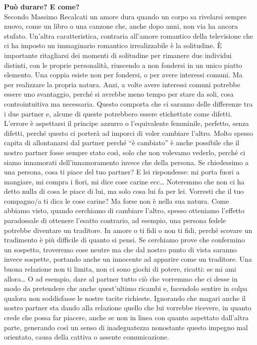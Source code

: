 \documentclass[12pt]{book} %
\begin{document}
\noindent \textbf{\large Può durare? E come?} \\
Secondo Massimo Recalcati un amore dura quando un corpo sa rivelarsi sempre nuovo, come un libro o una canzone che,
anche dopo anni, non via ha ancora stufato. Un'altra caratteristica, contraria
all'amore romantico della televisione che ci ha imposto un immaginario romantico irrealizzabile è
la solitudine. È importante ritagliarsi dei momenti di solitudine per rimanere due individui distinti, con le proprie
personalità, riuscendo a non fondersi in un unico piatto elemento. Una coppia esiste non per fondersi, o per avere
interessi comuni. Ma per realizzare la propria natura. Anzi, a volte avere interessi comuni potrebbe essere uno
svantaggio, perché si avrebbe meno tempo per stare da soli, cosa controintuitiva ma necessaria. Questo comporta che ci
saranno delle differenze tra i due partner e, alcune di queste potrebbero essere etichettate come difetti.
L'errore è aspettarsi il principe azzurro o l'equivalente femminile,
perfetto, senza difetti, perché questo ci porterà ad imporci di voler cambiare l'altro. Molto
spesso capita di allontanarsi dal partner perché “è cambiato” è anche possibile che il nostro partner fosse sempre stato così, solo che non
volevamo vederlo, perché ci siamo innamorati dell'innamoramento invece che della persona. Se
chiedessimo a una persona, cosa ti piace del tuo partner? E lei rispondesse: mi porta fuori a mangiare, mi compra i
fiori, mi dice cose carine ecc… Noteremmo che non ci ha detto nulla di cosa le piace di lui, ma solo cosa lui fa per
lei. 
Vorresti che il tuo compagno/a ti dica le cose carine? Ma forse non è nella sua natura.
Come abbiamo visto, quando cerchiamo di cambiare l'altro, spesso otteniamo
l'effetto paradossale di ottenere l'esatto contrario, ad esempio, una persona
fedele potrebbe diventare un traditore. In amore o ti fidi o non ti fidi, perché scovare un tradimento è più difficile di
quanto si pensi. Se cerchiamo prove che confermino un sospetto, troveremo cose neutre ma che dal nostro punto di vista
saranno invece sospette, portando anche un innocente ad apparire come un traditore. Una buona relazione non ti limita,
non ci sono giochi di potere, ricatti: se mi ami allora… O ad esempio, dare al partner tutto ciò che vorremmo che
ci desse in modo da pretendere che anche quest'ultimo ricambi e, facendolo sentire in colpa
qualora non soddisfasse le nostre tacite richieste. Ignorando che magari anche il nostro partner sta dando alla
relazione quello che lui vorrebbe ricevere, in quanto crede che possa far piacere, anche se non in linea con quanto
aspettato dall'altra parte, generando così un senso di inadeguatezza nonostante questo impegno mal
orientato, causa della cattiva o assente comunicazione.
\end{document}
